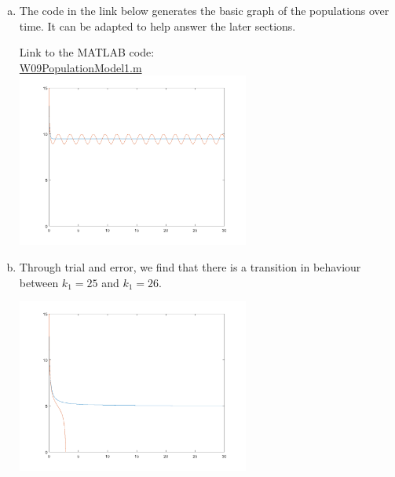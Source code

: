\begin{enumerate}[1.]
\begin{Solution}
\begin{enumerate}[(a)]
\item  The code in the link below generates the basic graph of the populations over time.  It can be adapted to help answer the later sections.

  Link to the MATLAB code: \\
  \href{http://www.mast.queensu.ca/~apsc171/MNTCP01/PracticeProblems/MATLAB/W09PopulationModel1.m}{W09PopulationModel1.m} \\

\includegraphics[width=3in]{graphics/Week09_PopulationModels/population_harvesting_1a}

\item Through trial and error, we find that there is a transition in
  behaviour between $k_1 = 25$ and $k_1 = 26$.
\begin{center}
\includegraphics[width=3in]{graphics/Week09_PopulationModels/population_harvesting_1b}
\end{center}


\end{enumerate}
\end{Solution}
\end{enumerate}
